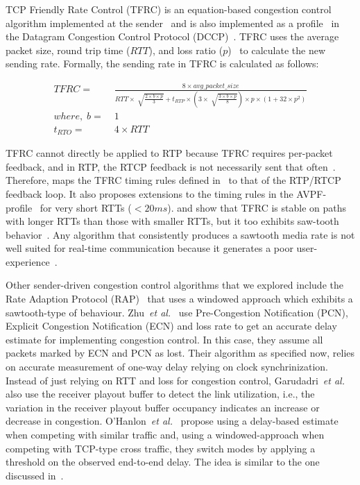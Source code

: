 TCP Friendly Rate Control (TFRC) is an equation-based congestion control
algorithm implemented at the sender~\cite{tfrc_347397} and is also implemented
as a profile~\cite{rfc4342} in the Datagram Congestion Control Protocol
(DCCP)~\cite{rfc4340}. TFRC uses the average packet size, round trip time
($RTT$), and loss ratio ($p$)~\cite{rfc3448} to calculate the new sending rate.
Formally, the sending rate in TFRC is calculated as follows:

\begin{align*}
 TFRC = &\; \frac{8 \times avg\_packet\_size}
{RTT \times \sqrt[]{\frac{2 \times b \times p}{3}} + t_{RTP} \times 
\left( 3 \times \sqrt[]{\frac{3 \times b \times p}{8}}\right) \times p \times
\left( 1+32 \times p^2 \right)}\\
where,\; b = &\; 1\\
t_{RTO} = &\; 4 \times RTT
\end{align*}

TFRC cannot directly be applied to RTP because TFRC requires per-packet
feedback, and in RTP, the RTCP feedback is not necessarily sent that
often~\cite{draft.rmcat.feedback}. Therefore, \cite{draft.rtp.tfrc} maps the
TFRC timing rules defined in~\cite{rfc4828, rfc5348} to that of the RTP/RTCP
feedback loop. It also proposes extensions to the timing rules in the
AVPF-profile~\cite{rfc4585} for very short RTTs ($<20ms$).
\cite{Gharai06:ICME} and \cite{VladBalan:2007dq} show that TFRC is stable on
paths with longer RTTs than those with smaller RTTs, but it too exhibits
saw-tooth behavior~\cite{saurin:2006:thesis}. Any algorithm that consistently
produces a sawtooth media rate is not well suited for real-time communication
because it generates a poor user-experience~\cite{Gharai:2002wt,
Zink03subjectiveimpression}.

Other sender-driven congestion control algorithms that we explored include the
Rate Adaption Protocol (RAP)~\cite{rap:752152} that uses a windowed approach which 
exhibits a sawtooth-type of behaviour. Zhu~\textit{et
al.}~\cite{rmcat-nada} use Pre-Congestion Notification (PCN), Explicit
Congestion Notification (ECN) and loss rate to get an accurate delay
estimate for implementing congestion control. In this case, they assume all
packets marked by ECN and PCN as lost. Their algorithm as specified now, 
relies on accurate measurement of one-way delay relying on clock synchrinization.
Instead of just relying on RTT and loss for congestion control, 
Garudadri~\textit{et al.}~\cite{4397059} also use the
receiver playout buffer to detect the link utilization, i.e., the variation in the 
receiver playout buffer occupancy indicates an increase or decrease in congestion.
O'Hanlon~\textit{et al.}~\cite{rmcat-dflow} propose using a delay-based
estimate when competing with similar traffic and, using a windowed-approach
when competing with TCP-type cross traffic, they switch modes by applying a
threshold on the observed end-to-end delay. The idea is similar to the one
discussed in~\cite{budzisz2011fair}.




